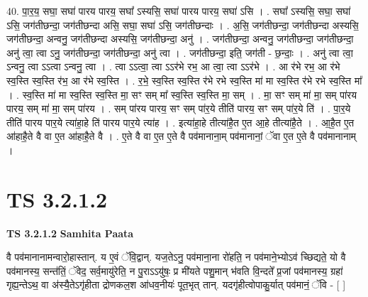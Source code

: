 \documentclass[17pt]{extarticle}
\begin{document}
40. पा॒र॒य॒ सघा॒ सघा॑ पारय पारय॒ सघा᳚ ऽस्यसि॒ सघा॑ पारय पारय॒ सघा॑ ऽसि । . सघा᳚ ऽस्यसि॒ सघा॒ सघा॑ ऽसि॒ जग॑तीछन्दा॒ जग॑तीछन्दा असि॒ सघा॒ सघा॑ ऽसि॒ जग॑तीछन्दाः । . अ॒सि॒ जग॑तीछन्दा॒ जग॑तीछन्दा अस्यसि॒ जग॑तीछन्दा॒ अन्वनु॒ जग॑तीछन्दा अस्यसि॒ जग॑तीछन्दा॒ अनु॑ । . जग॑तीछन्दा॒ अन्वनु॒ जग॑तीछन्दा॒ जग॑तीछन्दा॒ अनु॑ त्वा॒ त्वा ऽनु॒ जग॑तीछन्दा॒ जग॑तीछन्दा॒ अनु॑ त्वा । . जग॑तीछन्दा॒ इति॒ जग॑ती - छ॒न्दाः॒ । . अनु॑ त्वा त्वा॒ ऽन्वनु॒ त्वा ऽऽत्वा ऽन्वनु॒ त्वा । . त्वा ऽऽत्वा॒ त्वा ऽऽर॑भे रभ॒ आ त्वा॒ त्वा ऽऽर॑भे । . आ र॑भे रभ॒ आ र॑भे स्व॒स्ति स्व॒स्ति र॑भ॒ आ र॑भे स्व॒स्ति । . र॒भे॒ स्व॒स्ति स्व॒स्ति र॑भे रभे स्व॒स्ति मा॑ मा स्व॒स्ति र॑भे रभे स्व॒स्ति मा᳚ । . स्व॒स्ति मा॑ मा स्व॒स्ति स्व॒स्ति मा॒ सꣳ सम् मा᳚ स्व॒स्ति स्व॒स्ति मा॒ सम् । . मा॒ सꣳ सम् मा॑ मा॒ सम् पा॑रय पारय॒ सम् मा॑ मा॒ सम् पा॑रय । . सम् पा॑रय पारय॒ सꣳ सम् पा॑र॒ये तीति॑ पारय॒ सꣳ सम् पा॑र॒ये ति॑ । . पा॒र॒ये तीति॑ पारय पार॒ये त्या॑हा॒हे ति॑ पारय पार॒ये त्या॑ह । . इत्या॑हा॒हे तीत्या॑है॒त ए॒त आ॒हे तीत्या॑है॒ते । . आ॒है॒त ए॒त आ॑हाहै॒ते वै वा ए॒त आ॑हाहै॒ते वै । . ए॒ते वै वा ए॒त ए॒ते वै पव॑मानाना॒म् पव॑मानानां॒ ॅवा ए॒त ए॒ते वै पव॑मानानाम् । \newline
\pagebreak
{}

\section{ TS 3.2.1.2 }

\textbf{TS 3.2.1.2 } \newline
\textbf{Samhita Paata} \newline

वै पव॑मानानामन्वारो॒हास्तान्. य ए॒वं ॅवि॒द्वान्. यज॒तेऽनु॒ पव॑माना॒ना रो॑हति॒ न पव॑माने॒भ्योऽव॑ च्छिद्यते॒ यो वै पव॑मानस्य॒ सन्त॑तिं॒ ॅवेद॒ सर्व॒मायु॑रेति॒ न पु॒राऽऽयु॑षः॒ प्र मी॑यते पशु॒मान् भ॑वति वि॒न्दते᳚ प्र॒जां पव॑मानस्य॒ ग्रहा॑ गृह्य॒न्तेऽथ॒ वा अ॑स्यै॒तेऽगृ॑हीता द्रोणकल॒श आ॑धव॒नीयः॑ पूत॒भृत् तान्. यदगृ॑हीत्वोपाकु॒र्यात् पव॑मानं॒ ॅवि - [  ] \newline
\end{document}
